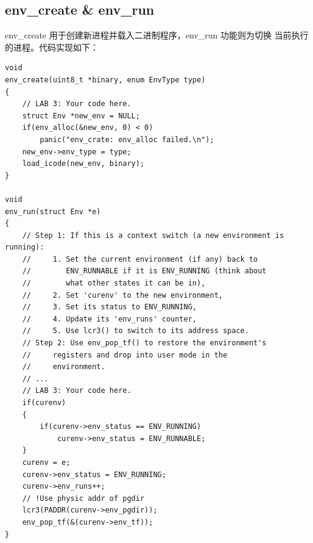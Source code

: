 \documentclass[12pt, letterpaper]{report}
\begin{document}
\subsection{\large env\_create \& env\_run}
env\_create 用于创建新进程并载入二进制程序，env\_run 功能则为切换
当前执行的进程。代码实现如下：\par 
\quad \par 
\lstset{style=CStyle}
\setmainfont{Consolas}
\begin{lstlisting}
void
env_create(uint8_t *binary, enum EnvType type)
{
    // LAB 3: Your code here.
    struct Env *new_env = NULL;
    if(env_alloc(&new_env, 0) < 0)
        panic("env_crate: env_alloc failed.\n");
    new_env->env_type = type;
    load_icode(new_env, binary);
}

void
env_run(struct Env *e)
{
	// Step 1: If this is a context switch (a new environment is running):
	//	   1. Set the current environment (if any) back to
	//	      ENV_RUNNABLE if it is ENV_RUNNING (think about
	//	      what other states it can be in),
	//	   2. Set 'curenv' to the new environment,
	//	   3. Set its status to ENV_RUNNING,
	//	   4. Update its 'env_runs' counter,
	//	   5. Use lcr3() to switch to its address space.
	// Step 2: Use env_pop_tf() to restore the environment's
	//	   registers and drop into user mode in the
	//	   environment.
    // ...
	// LAB 3: Your code here.
	if(curenv)
	{
		if(curenv->env_status == ENV_RUNNING)
			curenv->env_status = ENV_RUNNABLE;
	}
	curenv = e;
	curenv->env_status = ENV_RUNNING;
	curenv->env_runs++;
	// !Use physic addr of pgdir
	lcr3(PADDR(curenv->env_pgdir));
	env_pop_tf(&(curenv->env_tf));
}
\end{lstlisting}
\setmainfont{Times New Roman}
\end{document}
